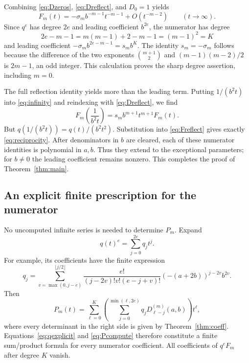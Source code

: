 \documentclass[11pt,a4paper]{article}
\numberwithin{equation}{section}
\theoremstyle{definition}
\theoremstyle{remark}
\newcommand{\D}[2]{D_{#1}^{(#2)}}
\begin{document}
Combining \eqref{eq:Dzeros}, \eqref{eq:Dreflect}, and $D_0=1$ yields
\begin{equation}\label{eq:leadinginfinity}
 F_m(t)=-\sigma_m b^{-m-1}t^{-m-1}+O(t^{-m-2})
 \qquad(t\longrightarrow\infty).
\end{equation}
Since $q^e$ has degree $2e$ and leading coefficient $b^{2e}$, the
numerator has degree
\begin{equation}\label{eq:degreeK}
 2e-m-1=m(m-1)+2-m-1=(m-1)^2=K
\end{equation}
and leading coefficient $-\sigma_m b^{2e-m-1}=s_m b^K$.
The identity $s_m=-\sigma_m$ follows because the difference of the two
exponents $\binom{m+1}{2}$ and $(m-1)(m-2)/2$ is $2m-1$, an odd integer.
This calculation proves the sharp degree assertion, including $m=0$.

The full reflection identity yields more than the leading term.
Putting $1/(b^2t)$ into \eqref{eq:infinity} and reindexing with
\eqref{eq:Dreflect}, we find
\begin{equation}\label{eq:Freflect}
 F_m\!\left(\frac1{b^2t}\right)
 =s_m b^{m+1}t^{m+1}F_m(t).
\end{equation}
But $q(1/(b^2t))=q(t)/(b^2t^2)$.  Substitution into
\eqref{eq:Freflect} gives exactly \eqref{eq:reciprocity}.
After denominators in $b$ are cleared, each of these numerator identities
is polynomial in $a,b$.  Thus they extend to the exceptional parameters;
for $b\ne0$ the leading coefficient remains nonzero.  This completes the
proof of Theorem~\ref{thm:main}.

\subsection{An explicit finite prescription for the numerator}
No uncomputed infinite series is needed to determine $P_m$.  Expand
\begin{equation}\label{eq:qcoeffs}
 q(t)^e=\sum_{j=0}^{2e}q_jt^j.
\end{equation}
For example, its coefficients have the finite expression
\begin{equation}\label{eq:qexplicit}
 q_j=\sum_{v=\max(0,j-e)}^{\lfloor j/2\rfloor}
 \frac{e!}{(j-2v)!v!(e-j+v)!}
       (-(a+2b))^{j-2v}b^{2v}.
\end{equation}
Then
\begin{equation}\label{eq:Pcompute}
 P_m(t)=\sum_{\ell=0}^{K}
 \left(\sum_{j=0}^{\min(\ell,2e)}q_j\D{\ell-j}{m}(a,b)\right)t^\ell,
\end{equation}
where every determinant in the right side is given by
Theorem~\ref{thm:coeff}.  Equations~\eqref{eq:qexplicit} and
\eqref{eq:Pcompute} therefore constitute a finite sum/product formula
for every numerator coefficient.  All coefficients of $q^eF_m$ after
degree $K$ vanish.
\end{document}
